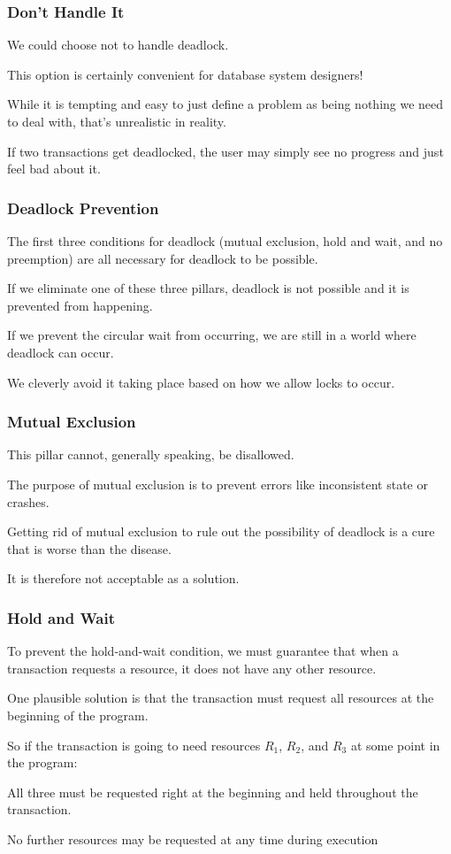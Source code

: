 \begin{frame}
\frametitle{Don't Handle It}

We could choose not to handle deadlock. 

This option is certainly convenient for database system designers! 

While it is tempting and easy to just define a problem as being nothing we need to deal with, that's unrealistic in reality. 

If two transactions get deadlocked, the user may simply see no progress and just feel bad about it. 

\end{frame}

\begin{frame}
\frametitle{Deadlock Prevention}

The first three conditions for deadlock (mutual exclusion, hold and wait, and no preemption) are all necessary for deadlock to be possible. 

If we eliminate one of these three pillars, deadlock is not possible and it is prevented from happening. 

If we prevent the circular wait from occurring, we are still in a world where deadlock can occur. 

We cleverly avoid it taking place based on how we allow locks to occur.

\end{frame}

\begin{frame}
\frametitle{Mutual Exclusion}

This pillar cannot, generally speaking, be disallowed. 

The purpose of  mutual exclusion is to prevent errors like inconsistent state or crashes. 

Getting rid of mutual exclusion to rule out the possibility of deadlock is a cure that is worse than the disease. 

It is therefore not acceptable as a solution.


\end{frame}

\begin{frame}
\frametitle{Hold and Wait}
To prevent the hold-and-wait condition, we must guarantee that when a transaction requests a resource, it does not have any other resource. 

One plausible solution is that the transaction must request all resources at the beginning of the program. 

So if the transaction is going to need resources $R_{1}$, $R_{2}$, and $R_{3}$ at some point in the program: 

All three must be requested right at the beginning and held throughout the transaction.

 No further resources may be requested at any time during execution

\end{frame}


